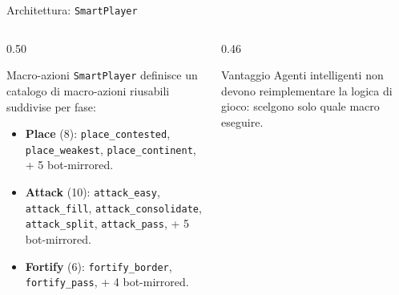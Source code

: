 \documentclass[9pt,serif,usenames,dvipsnames]{beamer}
\begin{document}
	\begin{frame}{\centering Architettura: \texttt{SmartPlayer}}
		\begin{columns}[T]
			\begin{column}{0.50\textwidth}
				\begin{block}{Macro-azioni}
					\small
					\texttt{SmartPlayer} definisce un \alert{catalogo di macro-azioni}
					riusabili suddivise per fase:
					\begin{itemize}
						\item \textbf{Place} (8): \texttt{place\_contested},
						\texttt{place\_weakest}, \texttt{place\_continent},
						+ 5 bot-mirrored.
						\item \textbf{Attack} (10): \texttt{attack\_easy},
						\texttt{attack\_fill}, \texttt{attack\_consolidate},
						\texttt{attack\_split}, \texttt{attack\_pass},
						+ 5 bot-mirrored.
						\item \textbf{Fortify} (6): \texttt{fortify\_border},
						\texttt{fortify\_pass},
						+ 4 bot-mirrored.
					\end{itemize}
				\end{block}
			\end{column}
			\begin{column}{0.46\textwidth}
				\vspace{0.1cm}
				\begin{center}
				\end{center}
				\vspace{0.10cm}
				\begin{alertblock}{Vantaggio}
					\small
					Agenti intelligenti \alert{non devono reimplementare} la logica
					di gioco: scelgono solo quale macro eseguire.
				\end{alertblock}
			\end{column}
		\end{columns}
	\end{frame}
\end{document}
